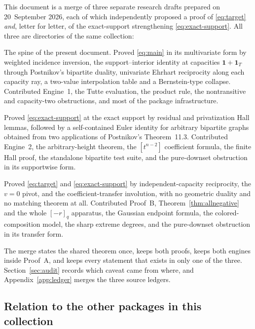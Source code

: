 \documentclass[11pt]{article}
\numberwithin{equation}{section}
\theoremstyle{definition}
\theoremstyle{remark}
\newcommand{\one}{\mathbf 1}
\newcommand{\qint}[1]{[#1]_q}
\begin{document}
This document is a merge of three separate research drafts prepared on
20~September 2026, each of which independently proposed a proof of
\eqref{eq:target} \emph{and}, letter for letter, of the exact-support
strengthening \eqref{eq:exact-support}. All three are directories of the same
collection:
\begin{description}[style=nextline,leftmargin=1.2em,labelwidth=0pt,labelindent=0pt,font=\normalfont\bfseries]
\item[\nolinkurl{enumerative-combinatorics/preorder-q-zeta-support-reciprocity}]
 The spine of the present document. Proved \eqref{eq:main} in its multivariate
 form by weighted incidence inversion, the support--interior identity at
 capacities $\one+\one_T$ through Postnikov's bipartite duality, univariate
 Ehrhart reciprocity along each capacity ray, a two-value interpolation table
 and a Bernstein-type collapse. Contributed Engine~1, the Tutte evaluation,
 the product rule, the nontransitive and capacity-two obstructions, and most
 of the package infrastructure.
\item[\nolinkurl{enumerative-combinatorics/preorder-q-zeta-supportwise}]
 Proved \eqref{eq:exact-support} at the exact support by residual and
 privatization Hall lemmas, followed by a self-contained Euler identity for
 arbitrary bipartite graphs obtained from two applications of Postnikov's
 Theorem~11.3. Contributed Engine~2, the arbitrary-height theorem, the
 $[t^{n-2}]$ coefficient formula, the finite Hall proof, the standalone
 bipartite test suite, and the pure-downset obstruction in its supportwise
 form.
\item[\nolinkurl{enumerative-combinatorics/preorder-q-reciprocity-weighted}]
 Proved \eqref{eq:target} and \eqref{eq:exact-support} by independent-capacity
 reciprocity, the $v=0$ pivot, and the coefficient-transfer involution, with
 no geometric duality and no matching theorem at all. Contributed Proof~B,
 Theorem~\ref{thm:allnegative} and the whole $\qint{-r}$ apparatus, the
 Gaussian endpoint formula, the colored-composition model, the sharp extreme
 degrees, and the pure-downset obstruction in its transfer form.
\end{description}
The merge states the shared theorem once, keeps both proofs, keeps both
engines inside Proof~A, and keeps every statement that exists in only one of
the three. Section~\ref{sec:audit} records which caveat came from where, and
Appendix~\ref{app:ledger} merges the three source ledgers.

\subsection{Relation to the other packages in this collection}
\label{sec:nonduplication}
\end{document}
